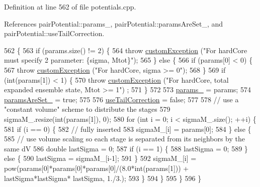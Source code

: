 Definition at line 562 of file potentials.\-cpp.



References pair\-Potential\-::params\-\_\-, pair\-Potential\-::params\-Are\-Set\-\_\-, and pair\-Potential\-::use\-Tail\-Correction.


\begin{DoxyCode}
562                                                                \{
563     \textcolor{keywordflow}{if} (params.size() != 2) \{
564         \textcolor{keywordflow}{throw} \hyperlink{classcustom_exception}{customException} (\textcolor{stringliteral}{"For hardCore must specify 2 parameter: \{sigma, Mtot\}"});
565     \} \textcolor{keywordflow}{else} \{
566         \textcolor{keywordflow}{if} (params[0] < 0) \{
567             \textcolor{keywordflow}{throw} \hyperlink{classcustom_exception}{customException} (\textcolor{stringliteral}{"For hardCore, sigma >= 0"});
568         \}
569         \textcolor{keywordflow}{if} (\textcolor{keywordtype}{int}(params[1]) < 1) \{
570             \textcolor{keywordflow}{throw} \hyperlink{classcustom_exception}{customException} (\textcolor{stringliteral}{"For hardCore, total expanded ensemble state, Mtot >= 1"})
      ;
571         \}
572 
573         \hyperlink{classpair_potential_abf8ec8af983d6e9960bd149da099e883}{params\_} = params;
574         \hyperlink{classpair_potential_a635755c0a952bfc05a4cfae230c3dbd2}{paramsAreSet\_} = \textcolor{keyword}{true};
575 
576         \hyperlink{classpair_potential_ab4b4538a7e13771f50a29aaac2443037}{useTailCorrection} = \textcolor{keyword}{false};
577 
578         \textcolor{comment}{// use a "constant volume" scheme to distribute the stages}
579         sigmaM\_.resize(\textcolor{keywordtype}{int}(params[1]), 0);
580         \textcolor{keywordflow}{for} (\textcolor{keywordtype}{int} i = 0; i < sigmaM\_.size(); ++i) \{
581             \textcolor{keywordflow}{if} (i == 0) \{
582                 \textcolor{comment}{// fully inserted}
583                 sigmaM\_[i] = params[0];
584             \} \textcolor{keywordflow}{else} \{
585                 \textcolor{comment}{// use volume scaling so each stage is separated from its neighbors by the same dV}
586                 \textcolor{keywordtype}{double} lastSigma = 0;
587                 \textcolor{keywordflow}{if} (i == 1) \{
588                     lastSigma = 0;
589                 \} \textcolor{keywordflow}{else} \{
590                     lastSigma = sigmaM\_[i-1];
591                 \}
592                 sigmaM\_[i] = pow(params[0]*params[0]*params[0]/(8.0*\textcolor{keywordtype}{int}(params[1])) + lastSigma*lastSigma*
      lastSigma, 1./3.);
593             \}
594         \}
595     \}
596 \}
\end{DoxyCode}
